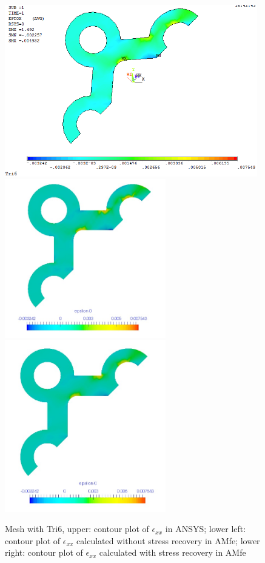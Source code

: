\begin{figure}[htbp]
	\begin{center}
		\includegraphics[width=11cm,clip]{Tri6_Exx.png} 	
		\includegraphics[width=7cm,clip]{Tri6_Exx_PD.png} 		
		\includegraphics[width=7cm,clip]{Tri6_Exx_P.png} 		
		\caption{Mesh with Tri6, upper: contour plot of $\epsilon_{xx}$ in ANSYS; lower left: contour plot of $\epsilon_{xx}$ calculated without stress recovery in AMfe; lower right: contour plot of $\epsilon_{xx}$ calculated with stress recovery in AMfe} \label{fig: Tri6_Exx}
	\end{center}
\end{figure}
\clearpage 

